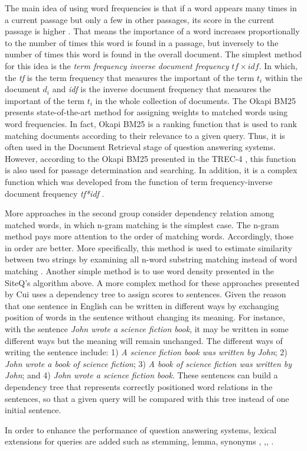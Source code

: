 The main idea of using word frequencies is that if a word appears many times in a current passage but only a few in other passages, its score in the current passage is higher \cite{robertson2004uid}. That means the importance of a word increases proportionally to the number of times this word is found in a passage, but inversely to the number of times this word is found in the overall document. The simplest method for this idea is the \textit{term frequency inverse document frequency} \textit{\ensuremath{tf\times idf}}. In which, the \textit{tf} is the term frequency that measures the important of the term \textit{\ensuremath{t_{i}}} within the document \textit{\ensuremath{d_{i}}} and \textit{idf} is the inverse document frequency that measures the important of the term \textit{\ensuremath{t_{i}}} in the whole collection of documents. The Okapi BM25 \cite{robertson1996ot, beaulieu1995ot, xue2008rmq, comas2008sdr, tellex2003qep} presents state-of-the-art method for assigning weights to matched words using word frequencies. In fact, Okapi BM25 is a ranking function that is used to rank matching documents according to their relevance to a given query. Thus, it is often used in the Document Retrieval stage of question answering systems. However, according to the Okapi BM25 presented in the TREC-4 \cite{robertson1996ot}, this function is also used for passage determination and searching. In addition, it is a complex function which was developed from the function of term frequency-inverse document frequency \textit{tf*idf} \cite{robertson2004uid}. 

More approaches in the second group consider dependency relation among matched words, in which n-gram matching is the simplest case. The n-gram method pays more attention to the order of matching words. Accordingly, those in order are better. More specifically, this method is used to estimate similarity between two strings by examining all n-word substring matching instead of word matching \cite{robertson1998ang}. Another simple method is to use word density presented in the SiteQ's algorithm above. A more complex method for these approaches presented by Cui \cite{cui2005qap} uses a dependency tree to assign scores to sentences. Given the reason that one sentence in English can be written in different ways by exchanging position of words in the sentence without changing its meaning. For instance, with the sentence \textit{John wrote a science fiction book}, it may be written in some different ways but the meaning will remain unchanged. The different ways of writing the sentence include: 1)  \textit{A science fiction book was written by John}; 2) \textit{John wrote a book of science fiction}; 3) \textit{A book of science fiction was written by John}; and 4) \textit{John wrote a science fiction book}. These sentences can build a dependency tree that represents correctly positioned word relations in the sentences, so that a given query will be compared with this tree instead of one initial sentence.
 
In order to enhance the performance of question answering systems, lexical extensions for queries are added such as stemming, lemma, synonyms \cite{light2002aec}, \cite{tellex2003pmf},\cite{bilotti2004wbq}, \cite{lee2002seh}.
